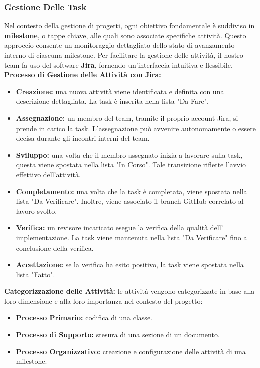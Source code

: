 \documentclass{article}
\begin{document}
\subsubsection{Gestione Delle Task}

Nel contesto della gestione di progetti, ogni obiettivo fondamentale è suddiviso in \textbf{milestone}, o tappe chiave, alle quali sono associate specifiche attività. Questo approccio consente un monitoraggio dettagliato dello stato di avanzamento interno di ciascuna milestone. Per facilitare la gestione delle attività, il nostro team fa uso del software \textbf{Jira}, fornendo un'interfaccia intuitiva e flessibile.\\
\textbf{Processo di Gestione delle Attività con Jira:}
\begin{itemize}
    \item \textbf{Creazione:} una nuova attività viene identificata e definita con una descrizione dettagliata. La task è inserita nella lista "Da Fare".
    \item \textbf{Assegnazione:} un membro del team, tramite il proprio account Jira, si prende in carico la task. L'assegnazione può avvenire autonomamente o essere decisa durante gli incontri interni del team.
    \item \textbf{Sviluppo:} una volta che il membro assegnato inizia a lavorare sulla task, questa viene spostata nella lista "In Corso". Tale transizione riflette l'avvio effettivo dell'attività.
    \item \textbf{Completamento:} una volta che la task è completata, viene spostata nella lista "Da Verificare". Inoltre, viene associato il branch GitHub correlato al lavoro svolto.
    \item \textbf{Verifica:} un revisore incaricato esegue la verifica della qualità dell' implementazione. La task viene mantenuta nella lista "Da Verificare" fino a conclusione della verifica.
    \item \textbf{Accettazione:} se la verifica ha esito positivo, la task viene spostata nella lista "Fatto".
\end{itemize}

\textbf{Categorizzazione delle Attività:} le attività vengono categorizzate in base alla loro dimensione e alla loro importanza nel contesto del progetto:
\begin{itemize}
    \item \textbf{Processo Primario:} codifica di una classe.
    \item \textbf{Processo di Supporto:} stesura di una sezione di un documento.
    \item \textbf{Processo Organizzativo:} creazione e configurazione delle attività di una milestone.
\end{itemize}
\end{document}
